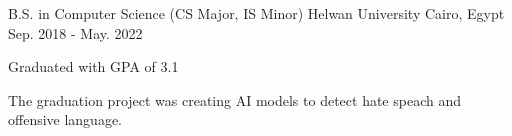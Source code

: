 

\begin{cventries}

  \cventry
    {B.S. in Computer Science (CS Major, IS Minor)} %
    {Helwan University} %
    {Cairo, Egypt} %
    {Sep. 2018 - May. 2022} %
    {
      \begin{cvitems} %
        \item {Graduated with GPA of 3.1}
        \item {The graduation project was creating AI models to detect hate speach and offensive language.}
      \end{cvitems}
    }

\end{cventries}
